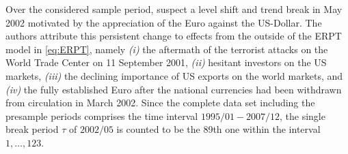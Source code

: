 Over the considered sample period, \citet{ArsovaOersal2016} suspect a level shift and trend break in May 2002 motivated by the appreciation of the Euro against the US-Dollar. The authors attribute this persistent change to effects from the outside of the ERPT model in \eqref{eq:ERPT}, namely \textit{(i)} the aftermath of the terrorist attacks on the World Trade Center on 11 September 2001, \textit{(ii)} hesitant investors on the US markets, \textit{(iii)} the declining importance of US exports on the world markets, and \textit{(iv)} the fully established Euro after the national currencies had been withdrawn from circulation in March 2002. Since the complete data set including the presample periods comprises the time interval $ 1995/01 - 2007/12 $, the single break period $ \tau $ of $ 2002/05 $ is counted to be the 89th one within the interval $ 1,\ldots,123$.

